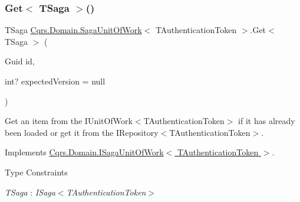 \subsubsection{\texorpdfstring{Get$<$ T\+Saga $>$()}{Get< TSaga >()}}
{\footnotesize\ttfamily T\+Saga \hyperlink{classCqrs_1_1Domain_1_1SagaUnitOfWork}{Cqrs.\+Domain.\+Saga\+Unit\+Of\+Work}$<$ T\+Authentication\+Token $>$.Get$<$ T\+Saga $>$ (\begin{DoxyParamCaption}\item[{Guid}]{id,  }\item[{int?}]{expected\+Version = {\ttfamily null} }\end{DoxyParamCaption})}



Get an item from the I\+Unit\+Of\+Work$<$\+T\+Authentication\+Token$>$ if it has already been loaded or get it from the I\+Repository$<$\+T\+Authentication\+Token$>$. 



Implements \hyperlink{interfaceCqrs_1_1Domain_1_1ISagaUnitOfWork_a4c4745fcebc42ba5c94647b22939809b_a4c4745fcebc42ba5c94647b22939809b}{Cqrs.\+Domain.\+I\+Saga\+Unit\+Of\+Work$<$ T\+Authentication\+Token $>$}.

\begin{Desc}
\item[Type Constraints]\begin{description}
\item[{\em T\+Saga} : {\em I\+Saga$<$T\+Authentication\+Token$>$}]\end{description}
\end{Desc}
